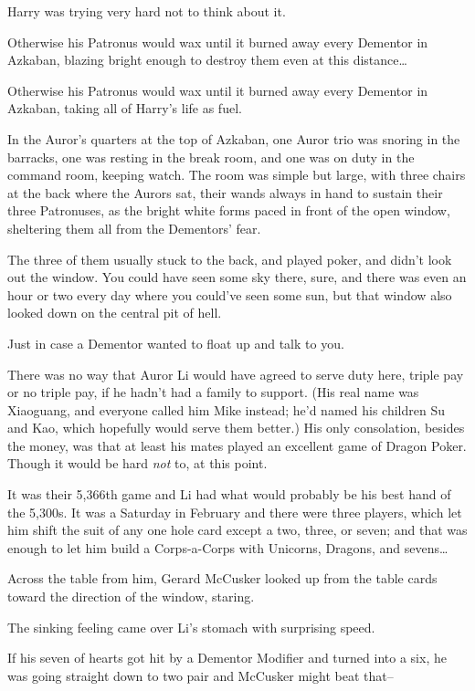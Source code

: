 Harry was trying very hard not to think about it.

Otherwise his Patronus would wax until it burned away every Dementor in Azkaban, blazing bright enough to destroy them even at this distance{\ldots}

Otherwise his Patronus would wax until it burned away every Dementor in Azkaban, taking all of Harry's life as fuel.

\later

In the Auror's quarters at the top of Azkaban, one Auror trio was snoring in the barracks, one was resting in the break room, and one was on duty in the command room, keeping watch. The room was simple but large, with three chairs at the back where the Aurors sat, their wands always in hand to sustain their three Patronuses, as the bright white forms paced in front of the open window, sheltering them all from the Dementors' fear.

The three of them usually stuck to the back, and played poker, and didn't look out the window. You could have seen some sky there, sure, and there was even an hour or two every day where you could've seen some sun, but that window also looked down on the central pit of hell.

Just in case a Dementor wanted to float up and talk to you.

There was no way that Auror Li would have agreed to serve duty here, triple pay or no triple pay, if he hadn't had a family to support. (His real name was Xiaoguang, and everyone called him Mike instead; he'd named his children Su and Kao, which hopefully would serve them better.) His only consolation, besides the money, was that at least his mates played an excellent game of Dragon Poker. Though it would be hard \emph{not} to, at this point.

It was their 5,366th game and Li had what would probably be his best hand of the 5,300s. It was a Saturday in February and there were three players, which let him shift the suit of any one hole card except a two, three, or seven; and that was enough to let him build a Corps-a-Corps with Unicorns, Dragons, and sevens{\ldots}

Across the table from him, Gerard McCusker looked up from the table cards toward the direction of the window, staring.

The sinking feeling came over Li's stomach with surprising speed.

If his seven of hearts got hit by a Dementor Modifier and turned into a six, he was going straight down to two pair and McCusker might beat that\---

